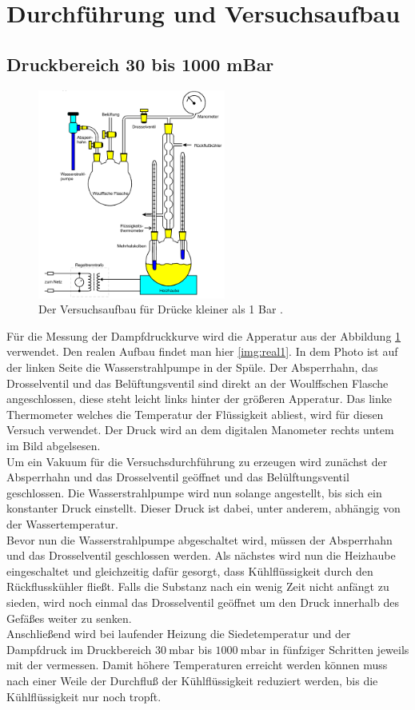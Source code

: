 \section{Durchführung und Versuchsaufbau}

\subsection{Druckbereich 30 bis 1000 mBar}
\begin{figure}[H]
    \centering
    \includegraphics[width=0.55\textwidth]{images/Abbildung3.PNG}
    \caption{Der Versuchsaufbau für Drücke kleiner als 1 Bar \protect \cite{V203}.}
    \label{img:aufbau1}
\end{figure}
Für die Messung der Dampfdruckkurve wird die Apperatur aus der Abbildung \ref{img:aufbau1} verwendet. 
Den realen Aufbau findet man hier \ref{img:real1}. In dem Photo ist auf der linken Seite die Wasserstrahlpumpe in der Spüle. 
Der Absperrhahn, das Drosselventil und das Belüftungsventil sind direkt an der Woulffschen Flasche angeschlossen, diese steht leicht 
links hinter der größeren Apperatur. Das linke Thermometer welches die Temperatur der Flüssigkeit abliest, wird für diesen Versuch 
verwendet. Der Druck wird an dem digitalen Manometer rechts untem im Bild abgelsesen.\\
Um ein Vakuum für die Versuchsdurchführung zu erzeugen wird zunächst der Absperrhahn und das Drosselventil geöffnet und das 
Belülftungsventil geschlossen. Die Wasserstrahlpumpe wird nun solange angestellt, bis sich ein konstanter Druck einstellt. 
Dieser Druck ist dabei, unter anderem, abhängig von der Wassertemperatur.\\
Bevor nun die Wasserstrahlpumpe abgeschaltet wird, müssen der Absperrhahn und das Drosselventil geschlossen werden. 
Als nächstes wird nun die Heizhaube eingeschaltet und gleichzeitig dafür gesorgt, dass Kühlflüssigkeit durch den Rückflusskühler fließt. 
Falls die Substanz nach ein wenig Zeit nicht anfängt zu sieden, wird noch einmal das Drosselventil geöffnet um den Druck innerhalb des Gefäßes weiter zu senken.\\
Anschließend wird bei laufender Heizung die Siedetemperatur und der Dampfdruck im Druckbereich $\SI{30}{\milli\bar}$ bis $\SI{1000}{\milli\bar}$ 
in fünfziger Schritten jeweils mit der vermessen. Damit höhere Temperaturen erreicht werden können 
muss nach einer Weile der Durchfluß der Kühlflüssigkeit reduziert werden, bis die Kühlflüssigkeit nur noch tropft.
